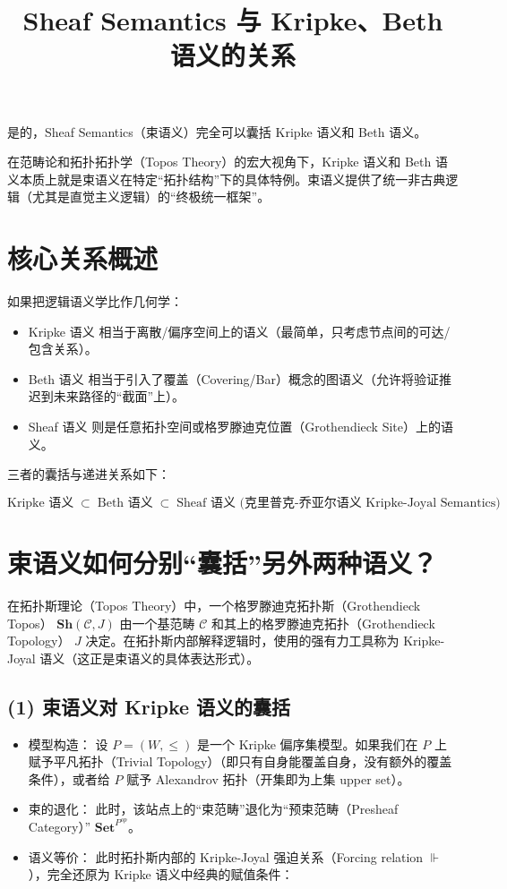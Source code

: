 \documentclass[12pt,a4paper]{article}
\title{Sheaf Semantics 与 Kripke、Beth 语义的关系}
\author{}
\date{}
\begin{document}
\maketitle

是的，Sheaf Semantics（束语义）完全可以囊括 Kripke 语义和 Beth 语义。

在范畴论和拓扑拓扑学（Topos Theory）的宏大视角下，Kripke 语义和 Beth 语义本质上就是束语义在特定“拓扑结构”下的具体特例。束语义提供了统一非古典逻辑（尤其是直觉主义逻辑）的“终极统一框架”。

\section{核心关系概述}

如果把逻辑语义学比作几何学：

\begin{itemize}
  \item Kripke 语义 相当于离散/偏序空间上的语义（最简单，只考虑节点间的可达/包含关系）。
  \item Beth 语义 相当于引入了覆盖（Covering/Bar）概念的图语义（允许将验证推迟到未来路径的“截面”上）。
  \item Sheaf 语义 则是任意拓扑空间或格罗滕迪克位置（Grothendieck Site）上的语义。
\end{itemize}

三者的囊括与递进关系如下：

\[
\text{Kripke 语义} \;\subset\; \text{Beth 语义} \;\subset\; \text{Sheaf 语义 (克里普克-乔亚尔语义 Kripke-Joyal Semantics)}
\]

\section{束语义如何分别“囊括”另外两种语义？}

在拓扑斯理论（Topos Theory）中，一个格罗滕迪克拓扑斯（Grothendieck Topos） $\mathbf{Sh}(\mathcal{C}, J)$ 由一个基范畴 $\mathcal{C}$ 和其上的格罗滕迪克拓扑（Grothendieck Topology） $J$ 决定。在拓扑斯内部解释逻辑时，使用的强有力工具称为 Kripke-Joyal 语义（这正是束语义的具体表达形式）。

\subsection{(1) 束语义对 Kripke 语义的囊括}

\begin{itemize}
  \item 模型构造： 设 $P = (W, \le)$ 是一个 Kripke 偏序集模型。如果我们在 $P$ 上赋予平凡拓扑（Trivial Topology）（即只有自身能覆盖自身，没有额外的覆盖条件），或者给 $P$ 赋予 Alexandrov 拓扑（开集即为上集 upper set）。
  \item 束的退化： 此时，该站点上的“束范畴”退化为“预束范畴（Presheaf Category）” $\mathbf{Set}^{P^{op}}$。
  \item 语义等价： 此时拓扑斯内部的 Kripke-Joyal 强迫关系（Forcing relation $\Vdash$），完全还原为 Kripke 语义中经典的赋值条件：
\end{itemize}
\end{document}
